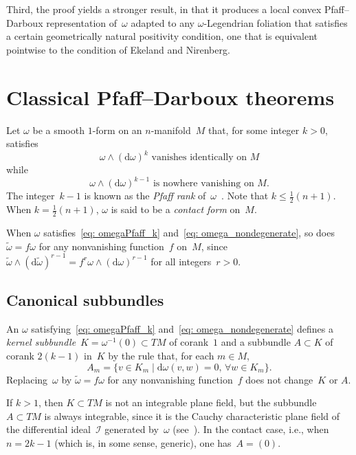 \documentclass[10pt,a4paper]{amsart}
\renewcommand{\d}{\mathrm{d}}%
\newcommand{\cI}{{\mathcal I}}
\newcommand{\w}{\wedge}
\numberwithin{equation}{section}
\begin{document}
Third, the proof yields a stronger result,
in that it produces a local convex Pfaff--Darboux representation
of~$\omega$ adapted to any $\omega$-Legendrian foliation
that satisfies a certain geometrically natural positivity condition,
one that is equivalent pointwise to the condition of Ekeland and Nirenberg.

\section{Classical Pfaff--Darboux theorems}
Let $\omega$ be a smooth $1$-form on an $n$-manifold~$M$
that, for some integer $k>0$, satisfies
\begin{equation}\label{eq: omegaPfaff_k}
\text{$\omega\w(\d\omega)^k$ vanishes identically on $M$}
\end{equation}
while
\begin{equation}\label{eq: omega_nondegenerate}
\text{$\omega\w(\d\omega)^{k-1}$ is nowhere vanishing on $M$.}
\end{equation}
The integer~$k{-}1$ is known as the \emph{Pfaff rank}
of~$\omega$~\cite[Chapter II, Section~3]{MR1083148}.
Note that $k\le \tfrac12(n{+}1)$. When $k=\tfrac12(n{+}1)$,
$\omega$ is said to be a \emph{contact form} on~$M$.

When $\omega$ satisfies~\eqref{eq: omegaPfaff_k}
and~\eqref{eq: omega_nondegenerate}, so does $\tilde\omega=f\omega$
for any nonvanishing function~$f$ on~$M$,
since $\tilde\omega\w(\d\tilde\omega)^{r-1} = f^r \omega\w(\d\omega)^{r-1}$
for all integers~$r>0$.

\subsection{Canonical subbundles}
An $\omega$ satisfying~\eqref{eq: omegaPfaff_k}
and~\eqref{eq: omega_nondegenerate} defines a \emph{kernel subbundle}~$K
= \omega^{-1}(0)\subset TM$ of corank~$1$
and a subbundle $A\subset K$ of corank $2(k{-}1)$ in~$K$
by the rule that, for each $m\in M$,
\begin{equation*}
A_m = \{ v\in K_m\mid \mathrm{d}\omega(v,w) = 0,\, \forall w\in K_m \}.
\end{equation*}
Replacing~$\omega$ by $\tilde\omega= f \omega$ for any nonvanishing
function~$f$ does not change~$K$ or $A$.

If $k>1$, then $K\subset TM$ is not an integrable plane field,
but the subbundle $A\subset TM$ is always integrable,
since it is the Cauchy characteristic plane field
of the differential ideal~$\cI$ generated by~$\omega$
(see~\cite[Chapter II, Proposition~2.1]{MR1083148}).
In the contact case, i.e., when $n=2k{-}1$ (which is,
in some sense, generic), one has~$A=(0)$.
\end{document}
